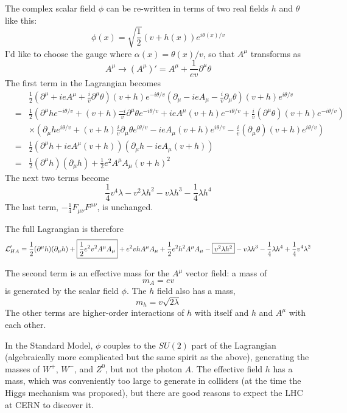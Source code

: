 \documentclass[12pt]{article}
\begin{document}
The complex scalar field $\phi$ can be re-written in terms of two real
fields $h$ and $\theta$ like this:
\begin{equation}
  \phi(x) = \sqrt{\frac{1}{2}} (v + h(x)) e^{i\theta(x)/v}
\end{equation}
I'd like to choose the gauge where $\alpha(x) = \theta(x) / v$, so
that $A^\mu$ transforms as
\begin{equation}
  A^\mu \to (A^\mu)' = A^\mu + \frac{1}{ev} \partial^\mu \theta
\end{equation}
The first term in the Lagrangian becomes
\begin{eqnarray}
  & & \frac{1}{2}(\partial^\mu + ieA^\mu + \frac{i}{v} \partial^\mu \theta)(v+h)e^{-i\theta/v}
  (\partial_\mu - ieA_\mu - \frac{i}{v} \partial_\mu \theta) (v + h) e^{i\theta/v} \\
  &=& \frac{1}{2}(\partial^\mu h e^{-i\theta/v} + (v+h)\frac{-i}{v} \partial^\mu \theta e^{-i\theta/v} + ieA^\mu(v+h)e^{-i\theta/v} + \frac{i}{v}(\partial^\mu \theta)(v+h)e^{-i\theta/v}) \\
  & & \times (\partial_\mu h e^{i\theta/v} + (v+h)\frac{i}{v} \partial_\mu \theta e^{i\theta/v} - ieA_\mu(v+h)e^{i\theta/v} - \frac{i}{v}(\partial_\mu \theta)(v+h)e^{i\theta/v}) \\
  &=& \frac{1}{2}(\partial^\mu h + ieA^\mu (v+h)) (\partial_\mu h - ieA_\mu(v+h)) \\
  &=& \frac{1}{2}(\partial^\mu h) (\partial_\mu h) + \frac{1}{2} e^2 A^\mu A_\mu (v + h)^2
\end{eqnarray}
The next two terms become
\begin{equation}
  \frac{1}{4} v^4 \lambda - v^2\lambda h^2 - v \lambda h^3 - \frac{1}{4} \lambda h^4
\end{equation}
The last term, $-\frac{1}{4} F_{\mu\nu}F^{\mu\nu}$, is unchanged.

The full Lagrangian is therefore
\begin{equation}
  \mathcal{L}_{HA}' = \frac{1}{2}(\partial^\mu h) (\partial_\mu h) + \fbox{$\displaystyle \frac{1}{2}e^2v^2 A^\mu A_\mu$} + e^2 v h A^\mu A_\mu + \frac{1}{2}e^2 h^2 A^\mu A_\mu
  - \fbox{$v^2 \lambda h^2$} - v \lambda h^3 - \frac{1}{4} \lambda h^4 + \frac{1}{4} v^4 \lambda^2
\end{equation}

The second term is an effective mass for the $A^\mu$ vector field: a mass of
\begin{equation}
  m_A = ev
\end{equation}
is generated by the scalar field $\phi$.  The $h$ field also has a mass,
\begin{equation}
  m_h = v \sqrt{2\lambda}
\end{equation}
The other terms are higher-order interactions of $h$ with itself and
$h$ and $A^\mu$ with each other.

In the Standard Model, $\phi$ couples to the $SU(2)$ part of the
Lagrangian (algebraically more complicated but the same spirit as the
above), generating the masses of $W^+$, $W^-$, and $Z^0$, but not the
photon $A$.  The effective field $h$ has a mass, which was
conveniently too large to generate in colliders (at the time the Higgs
mechanism was proposed), but there are good reasons to expect the LHC
at CERN to discover it.
\end{document}
